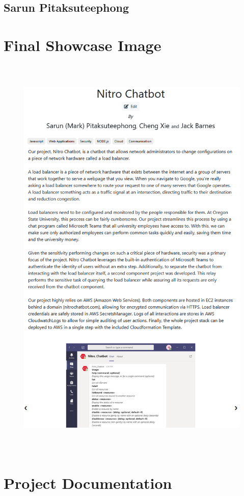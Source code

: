 \documentclass[onecolumn, draftclsnofoot,10pt, compsoc]{IEEEtran}
\begin{document}
\subsection{Sarun Pitaksuteephong}


\clearpage
\section{Final Showcase Image}
    \begin{figure}[ht]
        \centering
        \includegraphics[height=20cm]{showcase.png}
        \label{fig:Final Showcase Image}
    \end{figure}

\section{Project Documentation}
\end{document}

